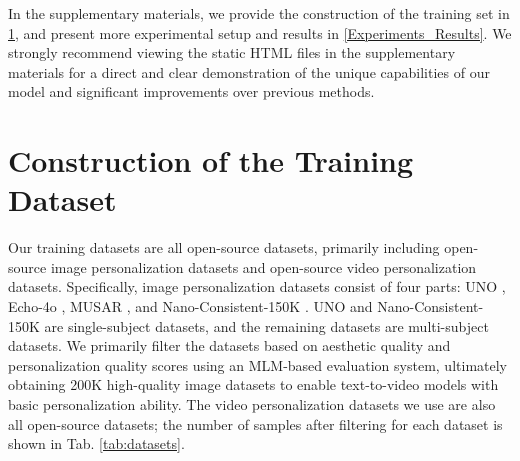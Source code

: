\documentclass{llmxive}
\providecommand{\beginappendix}{  \appendix
  \par\noindent{\titlefont \onblue{Appendix}\par}  \vspace{1em}}
\begin{document}







\beginappendix

In the supplementary materials, we provide the construction of the training set in \cref{TrainingSet}, and present more experimental setup and results in \cref{Experiments_Results}. We strongly recommend viewing the static HTML files in the supplementary materials for a direct and clear demonstration of the unique capabilities of our model and significant improvements over previous methods.



\section{Construction of the Training Dataset}
\label{TrainingSet}

Our training datasets are all open-source datasets, primarily including open-source image personalization datasets and open-source video personalization datasets. Specifically, image personalization datasets consist of four parts: UNO \cite{UNO}, Echo-4o \cite{echo-4o}, MUSAR \cite{musar}, and Nano-Consistent-150K \cite{echo-4o}. UNO and Nano-Consistent-150K are single-subject datasets, and the remaining datasets are multi-subject datasets. We primarily filter the datasets based on aesthetic quality and personalization quality scores using an MLM-based evaluation system, ultimately obtaining 200K high-quality image datasets to enable text-to-video models with basic personalization ability. The video personalization datasets we use are also all open-source datasets; the number of samples after filtering for each dataset is shown in Tab. \ref{tab:datasets}.
\end{document}
